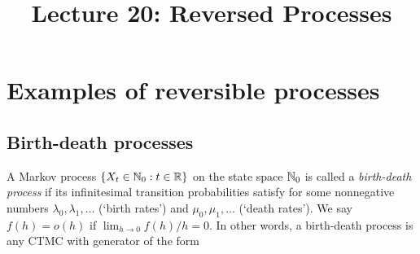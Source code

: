 \documentclass[a4paper,10pt,english]{article}
\title{Lecture 20: Reversed Processes}
\author{}
\begin{document}
\maketitle

\section{Examples of reversible processes}
\subsection{Birth-death processes}
A Markov process $\{X_t \in \mathbb{N}_0: t \in \mathbb{R}\}$ on the state space $\mathbb{N}_0$ is called a \textit{birth-death process} if its infinitesimal transition probabilities satisfy
for some nonnegative numbers $\lambda_0, \lambda_1, \ldots$ (`birth rates') and $\mu_0, \mu_1, \ldots$ (`death rates'). %
We say $f(h) = o(h)$ if $\lim_{h \to 0} f(h)/h = 0$.
In other words, a birth-death process is any CTMC with generator of the form 
\end{document}
